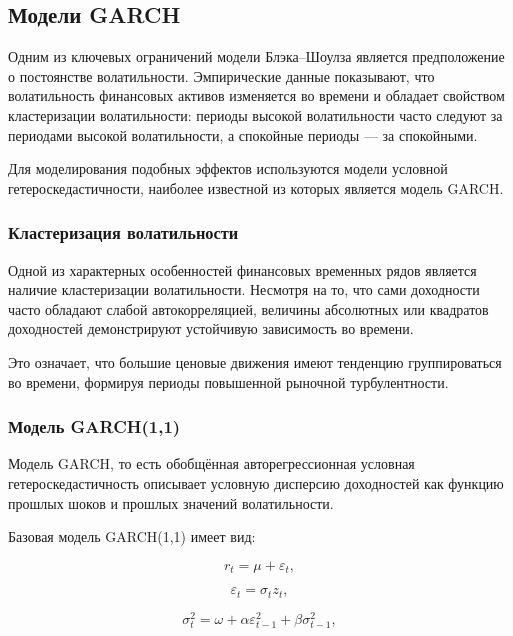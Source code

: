 \documentclass[11pt,a4paper]{article}
\begin{document}
\subsection{Модели GARCH}

Одним из ключевых ограничений модели Блэка--Шоулза является предположение о постоянстве волатильности. Эмпирические данные показывают, что волатильность финансовых активов изменяется во времени и обладает свойством кластеризации волатильности: периоды высокой волатильности часто следуют за периодами высокой волатильности, а спокойные периоды --- за спокойными.

Для моделирования подобных эффектов используются модели условной гетероскедастичности, наиболее известной из которых является модель GARCH.

\subsubsection{Кластеризация волатильности}

Одной из характерных особенностей финансовых временных рядов является наличие кластеризации волатильности. Несмотря на то, что сами доходности часто обладают слабой автокорреляцией, величины абсолютных или квадратов доходностей демонстрируют устойчивую зависимость во времени.

Это означает, что большие ценовые движения имеют тенденцию группироваться во времени, формируя периоды повышенной рыночной турбулентности.

\subsubsection{Модель GARCH(1,1)}

Модель GARCH, то есть обобщённая авторегрессионная условная гетероскедастичность описывает условную дисперсию доходностей как функцию прошлых шоков и прошлых значений волатильности.

Базовая модель GARCH(1,1) имеет вид:

\begin{equation}
r_t = \mu + \varepsilon_t,
\end{equation}

\begin{equation}
\varepsilon_t = \sigma_t z_t,
\end{equation}

\begin{equation}
\sigma_t^2 =
\omega
+
\alpha \varepsilon_{t-1}^2
+
\beta \sigma_{t-1}^2,
\end{equation}
\end{document}
